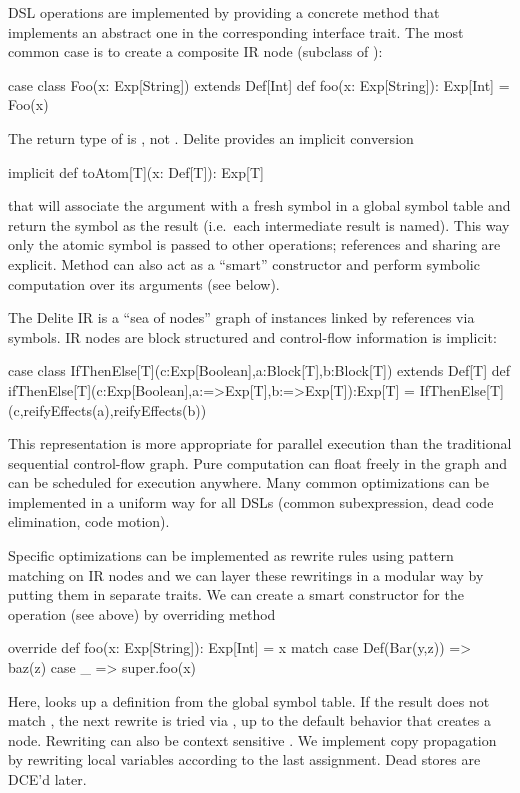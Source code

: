 DSL operations are implemented by providing a concrete
method that implements an abstract one in the corresponding interface
trait. The most common case is to create a composite IR node (subclass of ):
\begin{listing}
case class Foo(x: Exp[String]) extends Def[Int]
def foo(x: Exp[String]): Exp[Int] = Foo(x)
\end{listing}
The return type of  is , not . Delite provides
an implicit conversion
\begin{listing}
implicit def toAtom[T](x: Def[T]): Exp[T]
\end{listing}
that will associate the argument with a fresh symbol in a global symbol
table and return the symbol as the result 
(i.e.\ each intermediate result is named). 
This way only the atomic symbol is passed to other operations; 
references and sharing are explicit.                          
Method  can also act as a ``smart'' constructor
and perform symbolic computation over its arguments (see below).


The Delite IR is a ``sea of nodes'' graph of 
instances linked by references via symbols. IR nodes are block
structured and control-flow information is implicit:
\begin{listing}
case class IfThenElse[T](c:Exp[Boolean],a:Block[T],b:Block[T]) 
  extends Def[T]
def ifThenElse[T](c:Exp[Boolean],a:=>Exp[T],b:=>Exp[T]):Exp[T]
  = IfThenElse[T](c,reifyEffects(a),reifyEffects(b)) 
\end{listing}
This representation is more appropriate for parallel execution than the
traditional sequential control-flow graph. Pure computation can float freely in
the graph and can be scheduled for execution anywhere.
Many common optimizations can be implemented in a uniform way for all
DSLs (common subexpression, dead code elimination, code motion).

Specific optimizations can be implemented as rewrite rules
using pattern matching on IR nodes and we can layer these
rewritings in a modular way by putting them in separate
traits. We can create a smart constructor for the 
operation (see above) by overriding method 
\begin{listing}
override def foo(x: Exp[String]): Exp[Int] = x match {
  case Def(Bar(y,z)) => baz(z)
  case _ => super.foo(x)
}
\end{listing}
Here,  looks up a definition from the global symbol 
table. If the result does not match , the next rewrite 
is tried via , up
to the default behavior that creates a 
node.
Rewriting can also be context sensitive \cite{bravenboer05scopedtransformation}.
We implement copy propagation by rewriting
local variables according to the last assignment. %
Dead stores are DCE'd later. %



